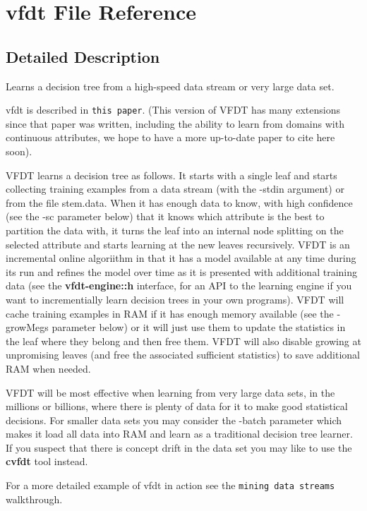 \section{vfdt File Reference}
\label{vfdt}


\subsection{Detailed Description}
Learns a decision tree from a high-speed data stream or very large data set. 

vfdt is described in {\tt this paper}. (This version of VFDT has many extensions since that paper was written, including the ability to learn from domains with continuous attributes, we hope to have a more up-to-date paper to cite here soon).

VFDT learns a decision tree as follows. It starts with a single leaf and starts collecting training examples from a data stream (with the -stdin argument) or from the file stem.data. When it has enough data to know, with high confidence (see the -sc parameter below) that it knows which attribute is the best to partition the data with, it turns the leaf into an internal node splitting on the selected attribute and starts learning at the new leaves recursively. VFDT is an incremental online algoriithm in that it has a model available at any time during its run and refines the model over time as it is presented with additional training data (see the {\bf vfdt-engine::h} interface, for an API to the learning engine if you want to incrementially learn decision trees in your own programs). VFDT will cache training examples in RAM if it has enough memory available (see the -grow\-Megs parameter below) or it will just use them to update the statistics in the leaf where they belong and then free them. VFDT will also disable growing at unpromising leaves (and free the associated sufficient statistics) to save additional RAM when needed.

VFDT will be most effective when learning from very large data sets, in the millions or billions, where there is plenty of data for it to make good statistical decisions. For smaller data sets you may consider the -batch parameter which makes it load all data into RAM and learn as a traditional decision tree learner. If you suspect that there is concept drift in the data set you may like to use the {\bf cvfdt} tool instead.

For a more detailed example of vfdt in action see the {\tt mining data streams} walkthrough.

